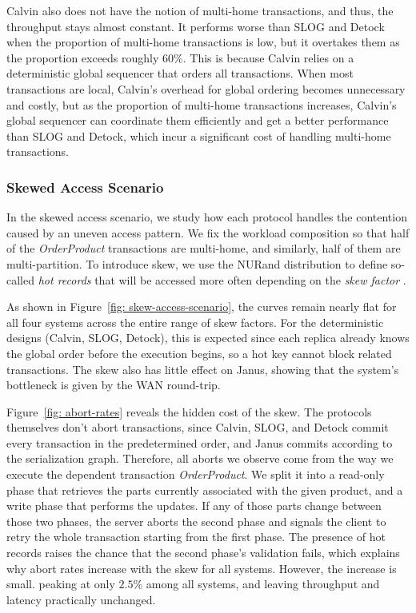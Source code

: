 Calvin also does not have the notion of multi-home transactions, and thus, the throughput stays almost constant. It performs worse than SLOG and Detock when the proportion of multi-home transactions is low, but it overtakes them as the proportion exceeds roughly $60\%$. This is because Calvin relies on a deterministic global sequencer that orders all transactions. When most transactions are local, Calvin's overhead for global ordering becomes unnecessary and costly, but as the proportion of multi-home transactions increases, Calvin's global sequencer can coordinate them efficiently and get a better performance than SLOG and Detock, which incur a significant cost of handling multi-home transactions.

\subsubsection{Skewed Access Scenario}
\label{subsubsec: skew-access-scenario}
In the skewed access scenario, we study how each protocol handles the contention caused by an uneven access pattern. We fix the workload composition so that half of the \textit{OrderProduct} transactions are multi-home, and similarly, half of them are multi-partition. To introduce skew, we use the NURand distribution to define so-called \textit{hot records} that will be accessed more often depending on the \textit{skew factor} \cite{council2010tpc}.

As shown in Figure~\ref{fig: skew-access-scenario}, the curves remain nearly flat for all four systems across the entire range of skew factors. For the deterministic designs (Calvin, SLOG, Detock), this is expected since each replica already knows the global order before the execution begins, so a hot key cannot block related transactions. The skew also has little effect on Janus, showing that the system's bottleneck is given by the WAN round-trip.

Figure~\ref{fig: abort-rates} reveals the hidden cost of the skew. The protocols themselves don't abort transactions, since Calvin, SLOG, and Detock commit every transaction in the predetermined order, and Janus commits according to the serialization graph. Therefore, all aborts we observe come from the way we execute the dependent transaction \textit{OrderProduct}. We split it into a read-only phase that retrieves the parts currently associated with the given product, and a write phase that performs the updates. If any of those parts change between those two phases, the server aborts the second phase and signals the client to retry the whole transaction starting from the first phase. The presence of hot records raises the chance that the second phase's validation fails, which explains why abort rates increase with the skew for all systems. However, the increase is small. peaking at only $2.5\%$ among all systems, and leaving throughput and latency practically unchanged.

